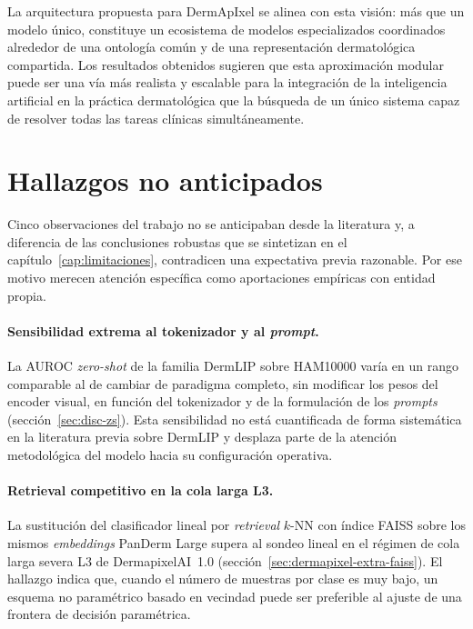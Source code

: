 La arquitectura propuesta para DermApIxel se alinea con esta visión:
más que un modelo único, constituye un ecosistema de modelos
especializados coordinados alrededor de una ontología común y de una
representación dermatológica compartida. Los resultados obtenidos
sugieren que esta aproximación modular puede ser una vía más realista y
escalable para la integración de la inteligencia artificial en la
práctica dermatológica que la búsqueda de un único sistema capaz de
resolver todas las tareas clínicas simultáneamente.

\section{Hallazgos no anticipados}
\label{sec:hallazgos}

Cinco observaciones del trabajo no se anticipaban desde la literatura y,
a diferencia de las conclusiones robustas que se sintetizan en el
capítulo~\ref{cap:limitaciones}, contradicen una expectativa previa
razonable. Por ese motivo merecen atención específica como aportaciones
empíricas con entidad propia.

\paragraph{Sensibilidad extrema al tokenizador y al \emph{prompt}.}
La AUROC \emph{zero-shot} de la familia DermLIP sobre HAM10000 varía en un
rango comparable al de cambiar de paradigma completo, sin modificar los
pesos del encoder visual, en función del tokenizador y de la formulación
de los \emph{prompts} (sección~\ref{sec:disc-zs}). Esta sensibilidad no
está cuantificada de forma sistemática en la literatura previa sobre
DermLIP y desplaza parte de la atención metodológica del modelo hacia su
configuración operativa.

\paragraph{Retrieval competitivo en la cola larga L3.}
La sustitución del clasificador lineal por \emph{retrieval} $k$-NN con
índice FAISS sobre los mismos \emph{embeddings} PanDerm Large supera al
sondeo lineal en el régimen de cola larga severa L3 de DermapixelAI~1.0
(sección~\ref{sec:dermapixel-extra-faiss}). El hallazgo indica que, cuando
el número de muestras por clase es muy bajo, un esquema no paramétrico
basado en vecindad puede ser preferible al ajuste de una frontera de
decisión paramétrica.

